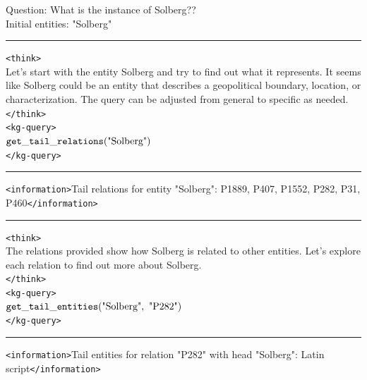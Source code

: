 \begin{table}[H]
\centering
\caption{Example \framework{} response in . \textcolor{blue}{Blue} denotes responses generated by the \framework{} agent.}
\begin{reasonbox}[title=\framework{} Response Example — \dataset{T-REx}]
Question: What is the instance of Solberg?? \\
Initial entities: "Solberg"
\vspace{0.5em}\hrule\vspace{0.5em}

\begin{blueblock}
\texttt{<think>} \\
Let's start with the entity Solberg and try to find out what it represents. It seems like Solberg could be an entity that describes a geopolitical boundary, location, or characterization. The query can be adjusted from general to specific as needed. \\
\texttt{</think>} \\
\texttt{<kg-query>} \\
$\mathtt{get\_tail\_relations}(\text{"Solberg"})$ \\
\texttt{</kg-query>}
\end{blueblock}

\vspace{0.5em}\hrule\vspace{0.5em}
\texttt{<information>}Tail relations for entity "Solberg": P1889, P407, P1552, P282, P31, P460\texttt{</information>}
\vspace{0.5em}\hrule\vspace{0.5em}

\begin{blueblock}
\texttt{<think>} \\
The relations provided show how Solberg is related to other entities. Let's explore each relation to find out more about Solberg. \\
\texttt{</think>} \\
\texttt{<kg-query>} \\
$\gettailentities(\text{"Solberg"},\ \text{"P282"})$ \\
\texttt{</kg-query>}
\end{blueblock}

\vspace{0.5em}\hrule\vspace{0.5em}

\texttt{<information>}Tail entities for relation "P282" with head "Solberg": Latin script\texttt{</information>}


\end{reasonbox}
\end{table}
